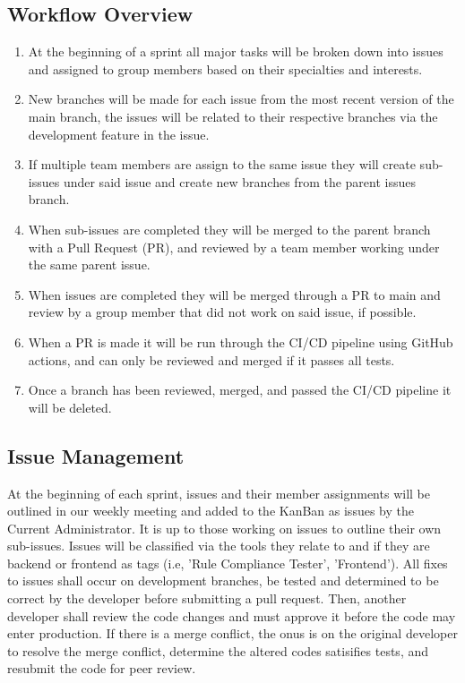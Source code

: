 \documentclass{article}
\begin{document}
\subsection{Workflow Overview}
\begin{enumerate}
  \item At the beginning of a sprint all major tasks will be broken down into issues and assigned to group members based on their specialties and interests.
  \item New branches will be made for each issue from the most recent version of the main branch, the issues will be related to their respective branches via the development feature in the issue.
  \item If multiple team members are assign to the same issue they will create sub-issues under said issue and create new branches from the parent issues branch.
  \item When sub-issues are completed they will be merged to the parent branch with a Pull Request (PR), and reviewed by a team member working under the same parent issue.
  \item When issues are completed they will be merged through a PR to main and review by a group member that did not work on said issue, if possible.
  \item When a PR is made it will be run through the CI/CD pipeline using GitHub actions, and can only be reviewed and merged if it passes all tests.
  \item Once a branch has been reviewed, merged, and passed the CI/CD pipeline it will be deleted.
\end{enumerate}
\subsection{Issue Management}
At the beginning of each sprint, issues and their member assignments will be outlined in our weekly meeting and added to the KanBan as issues by the Current Administrator. It is up to those working on issues to outline their own sub-issues.
Issues will be classified via the tools they relate to and if they are backend or frontend as tags (i.e, 'Rule Compliance Tester', 'Frontend'). All fixes to issues
shall occur on development branches, be tested and determined to be correct by the developer before submitting a pull request. Then,
another developer shall review the code changes and must approve it before the code may enter production. If there is a merge conflict,
the onus is on the original developer to resolve the merge conflict, determine the altered codes satisifies tests, and resubmit the code for 
peer review.
\end{document}
